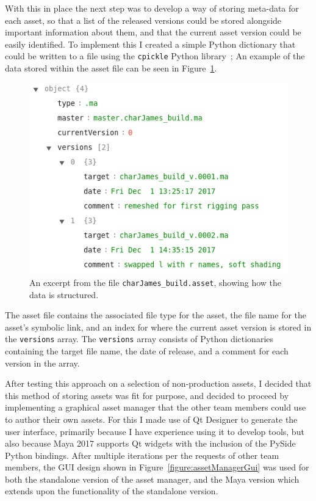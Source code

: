 \documentclass[11pt]{article}
\begin{document}
With this in place the next step was to develop a way of storing meta-data for each asset, so that a list of the released versions could be stored alongside important information about them, and that the current asset version could be easily identified. To implement this I created a simple Python dictionary that could be written to a file using the \texttt{cpickle} Python library~\cite{cpickle}; An example of the data stored within the asset file can be seen in Figure~\ref{figure:exampleAsset}.

\begin{figure}[htbp]\centering
	\includegraphics[width=0.8\linewidth]{images/assetExample.png}
	\caption{\label{figure:exampleAsset} An excerpt from the file \texttt{charJames\_build.asset}, showing how the data is structured.}
\end{figure}

The asset file contains the associated file type for the asset, the file name for the asset's symbolic link, and an index for where the current asset version is stored in the \texttt{versions} array. The \texttt{versions} array consists of Python dictionaries containing the target file name, the date of release, and a comment for each version in the array.

After testing this approach on a selection of non-production assets, I decided that this method of storing assets was fit for purpose, and decided to proceed by implementing a graphical asset manager that the other team members could use to author their own assets. For this I made use of Qt Designer to generate the user interface, primarily because I have experience using it to develop tools, but also because Maya 2017 supports Qt widgets with the inclusion of the PySide Python bindings. After multiple iterations per the requests of other team members, the GUI design shown in Figure~\ref{figure:assetManagerGui} was used for both the standalone version of the asset manager, and the Maya version which extends upon the functionality of the standalone version.
\end{document}
